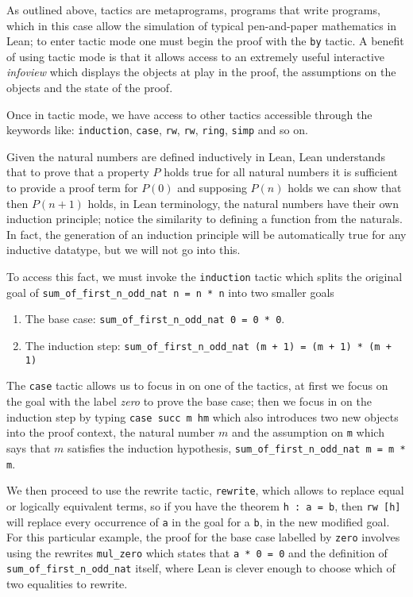 \begin{example}
    As outlined above, tactics are metaprograms, programs that write programs, which in this case allow the simulation of typical pen-and-paper mathematics
    in Lean; to enter tactic mode one must begin the proof with the \texttt{by} tactic. A benefit of using tactic mode is that it allows access to an extremely useful
    interactive \textit{infoview} which displays the objects at play in the proof, the assumptions on the objects and the state of the proof.

    Once in tactic mode, we have access to other tactics accessible through the keywords like: \texttt{induction}, \texttt{case}, \texttt{rw}, \texttt{rw}, \texttt{ring}, \texttt{simp} and so on.
    
    Given the natural numbers are defined inductively in Lean, Lean understands that to prove that a property $P$ holds true for all natural numbers
    it is sufficient to provide a proof term for $P(0)$ and supposing $P(n)$ holds we can show that then $P(n+1)$ holds, in Lean terminology, the natural numbers
    have their own induction principle; notice the similarity to defining a function from the naturals. In fact, the generation of an induction principle 
    will be automatically true for any inductive datatype, but we will not go into this.
    
    To access this fact, we must invoke the \texttt{induction} tactic which splits the original goal of \texttt{sum\_of\_first\_n\_odd\_nat n = n * n} into two smaller goals

    \begin{enumerate}
        \item The base case: \texttt{sum\_of\_first\_n\_odd\_nat 0 = 0 * 0}.
        \item The induction step: \texttt{sum\_of\_first\_n\_odd\_nat (m + 1) = (m + 1) * (m + 1)}
    \end{enumerate}

    The \texttt{case} tactic allows us to focus in on one of the tactics, at first we focus on the goal with the label \textit{zero} to prove the base case;
    then we focus in on the induction step by typing \texttt{case succ m hm} which also introduces two new objects into the proof context, the natural number $m$ and the assumption
    on \texttt{m} which says that $m$ satisfies the induction hypothesis, \texttt{sum\_of\_first\_n\_odd\_nat m = m * m}. 
    
    We then proceed to use the rewrite tactic, \texttt{rewrite}, which allows to replace equal or logically equivalent terms, so if you have the theorem \texttt{h : a = b}, then \texttt{rw [h]} will replace every occurrence of \texttt{a} in the goal
    for a \texttt{b}, in the new modified goal. For this particular example, the proof for the base case labelled by \texttt{zero} involves using the rewrites \texttt{mul\_zero} which states that \texttt{a * 0 = 0} and
    the definition of  \texttt{sum\_of\_first\_n\_odd\_nat} itself, where Lean is clever enough to choose which of two equalities to rewrite.


\end{example}
